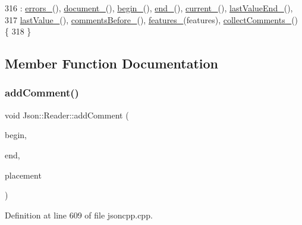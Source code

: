 \begin{DoxyCode}
316     : \hyperlink{class_json_1_1_reader_a1bbce45dc4df753bed60c129f4b5147c}{errors\_}(), \hyperlink{class_json_1_1_reader_abf99e137bc92a93623dc97598702261a}{document\_}(), \hyperlink{class_json_1_1_reader_a327166839022ea91f0a8290960a8af76}{begin\_}(), \hyperlink{class_json_1_1_reader_a714793579cbf4ee7c5a7223d2c8d77c1}{end\_}(), 
      \hyperlink{class_json_1_1_reader_a2f2feb5201a26da7aa133d2f7434479b}{current\_}(), \hyperlink{class_json_1_1_reader_a497a114f7b760f1b794b8fff9876615a}{lastValueEnd\_}(),
317       \hyperlink{class_json_1_1_reader_a87cc75ae5adc6a6755f0ba1c7255ff6c}{lastValue\_}(), \hyperlink{class_json_1_1_reader_af777967adaf0b2e882efa07673754381}{commentsBefore\_}(), \hyperlink{class_json_1_1_reader_aa9984ff8f519b5541346157b7aebf97b}{features\_}(features), 
      \hyperlink{class_json_1_1_reader_a8e9ce743f6004f0596692f0a9ee4626c}{collectComments\_}() \{
318 \}
\end{DoxyCode}


\subsection{Member Function Documentation}
\mbox{\label{class_json_1_1_reader_aaea3bd62d12ffb6117a61476c0685049}} 
\subsubsection{\texorpdfstring{add\+Comment()}{addComment()}}
{\footnotesize\ttfamily void Json\+::\+Reader\+::add\+Comment (\begin{DoxyParamCaption}\item[{\hyperlink{class_json_1_1_reader_a46795b5b272bf79a7730e406cb96375a}{Location}}]{begin,  }\item[{\hyperlink{class_json_1_1_reader_a46795b5b272bf79a7730e406cb96375a}{Location}}]{end,  }\item[{\hyperlink{namespace_json_a4fc417c23905b2ae9e2c47d197a45351}{Comment\+Placement}}]{placement }\end{DoxyParamCaption})\hspace{0.3cm}{\ttfamily [private]}}



Definition at line 609 of file jsoncpp.\+cpp.




